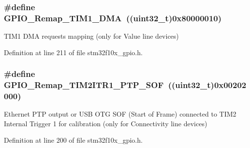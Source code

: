\subsubsection[{\texorpdfstring{G\+P\+I\+O\+\_\+\+Remap\+\_\+\+T\+I\+M1\+\_\+\+D\+MA}{GPIO_Remap_TIM1_DMA}}]{\setlength{\rightskip}{0pt plus 5cm}\#define G\+P\+I\+O\+\_\+\+Remap\+\_\+\+T\+I\+M1\+\_\+\+D\+MA~(({\bf uint32\+\_\+t})0x80000010)}\hypertarget{group___g_p_i_o___remap__define_ga255adf908d7d530267707fee39ba2026}{}\label{group___g_p_i_o___remap__define_ga255adf908d7d530267707fee39ba2026}
T\+I\+M1 D\+MA requests mapping (only for Value line devices) 

Definition at line 211 of file stm32f10x\+\_\+gpio.\+h.

\subsubsection[{\texorpdfstring{G\+P\+I\+O\+\_\+\+Remap\+\_\+\+T\+I\+M2\+I\+T\+R1\+\_\+\+P\+T\+P\+\_\+\+S\+OF}{GPIO_Remap_TIM2ITR1_PTP_SOF}}]{\setlength{\rightskip}{0pt plus 5cm}\#define G\+P\+I\+O\+\_\+\+Remap\+\_\+\+T\+I\+M2\+I\+T\+R1\+\_\+\+P\+T\+P\+\_\+\+S\+OF~(({\bf uint32\+\_\+t})0x00202000)}\hypertarget{group___g_p_i_o___remap__define_ga0dc4bec540b9372479e63295fe68ac17}{}\label{group___g_p_i_o___remap__define_ga0dc4bec540b9372479e63295fe68ac17}
Ethernet P\+TP output or U\+SB O\+TG S\+OF (Start of Frame) connected to T\+I\+M2 Internal Trigger 1 for calibration (only for Connectivity line devices) 

Definition at line 200 of file stm32f10x\+\_\+gpio.\+h.

